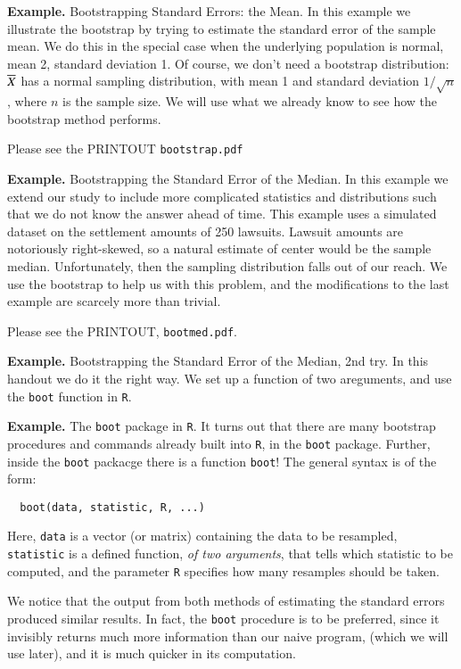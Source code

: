 \documentclass[captions=tableheading]{scrbook}
\begin{document}
\textbf{Example.} Bootstrapping Standard Errors: the Mean.  In this example we illustrate the bootstrap by trying to estimate the standard error of the sample mean. We do this in the special case when the underlying population is normal, mean 2, standard deviation 1. Of course, we don't need a bootstrap distribution: $\overline{X}$ has a normal sampling distribution, with mean 1 and standard deviation $1/\sqrt{n}$, where $n$ is the sample size. We will use what we already know to see how the bootstrap method performs.

Please see the PRINTOUT \texttt{bootstrap.pdf}


\textbf{Example.} Bootstrapping the Standard Error of the Median. In this example we extend our study to include more complicated statistics and distributions such that we do not know the answer ahead of time. This example uses a simulated dataset on the settlement amounts of 250 lawsuits. Lawsuit amounts are notoriously right-skewed, so a natural estimate of center would be the sample median. Unfortunately, then the sampling distribution falls out of our reach. We use the bootstrap to help us with this problem, and the modifications to the last example are scarcely more than trivial.

Please see the PRINTOUT, \texttt{bootmed.pdf}.  

\textbf{Example.} Bootstrapping the Standard Error of the Median, 2nd try.  In this handout we do it the right way.  We set up a function of two areguments, and use the \texttt{boot} function in \texttt{R}. 


\textbf{Example.} The \texttt{boot} package in \texttt{R}. It turns out that there are many bootstrap procedures and commands already built into \texttt{R}, in the \texttt{boot} package. Further, inside the \texttt{boot} packacge there is a function \texttt{boot}! The general syntax is of the form:

\begin{verbatim}
  boot(data, statistic, R, ...)
\end{verbatim}


Here, \texttt{data} is a vector (or matrix) containing the data to be resampled, \texttt{statistic} is a defined function, \emph{of two arguments}, that tells which statistic to be computed, and the parameter \texttt{R} specifies how many resamples should be taken.

 

We notice that the output from both methods of estimating the standard errors produced similar results. In fact, the \texttt{boot} procedure is to be preferred, since it invisibly returns much more information than our naive program, (which we will use later), and it is much quicker in its computation.  
\end{document}
